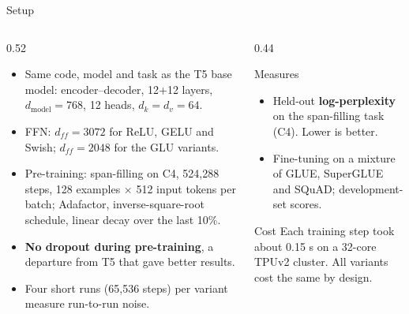 \documentclass[aspectratio=169,11pt]{beamer}
\begin{document}
\begin{frame}{Setup}
  \begin{columns}[T]
    \begin{column}{0.52\textwidth}
      \small
      \begin{itemize}
        \item Same code, model and task as the T5 base model: encoder--decoder, 12+12 layers, $d_{\text{model}}=768$, 12 heads, $d_k=d_v=64$.
        \item FFN: $d_{ff}=3072$ for ReLU, GELU and Swish; $d_{ff}=2048$ for the GLU variants.
        \item Pre-training: span-filling on C4, 524,288 steps, 128 examples $\times$ 512 input tokens per batch; Adafactor, inverse-square-root schedule, linear decay over the last 10\%.
        \item \textbf{No dropout during pre-training}, a departure from T5 that gave better results.
        \item Four short runs (65,536 steps) per variant measure run-to-run noise.
      \end{itemize}
    \end{column}
    \begin{column}{0.44\textwidth}
      \begin{block}{Measures}
        \small
        \begin{itemize}
          \item Held-out \textbf{log-perplexity} on the span-filling task (C4). Lower is better.
          \item Fine-tuning on a mixture of GLUE, SuperGLUE and SQuAD; development-set scores.
        \end{itemize}
      \end{block}
      \begin{exampleblock}{Cost}
        \small
        Each training step took about 0.15 s on a 32-core TPUv2 cluster. All variants cost the same by design.
      \end{exampleblock}
    \end{column}
  \end{columns}
\end{frame}
\end{document}
